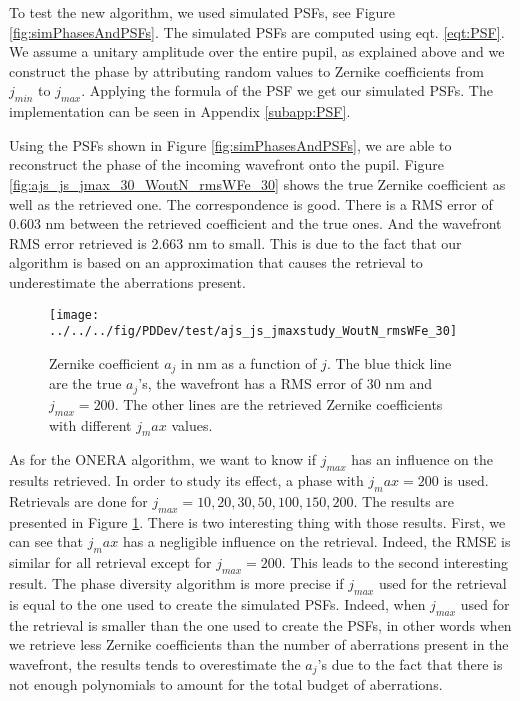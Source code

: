 To test the new algorithm, we used simulated PSFs, see Figure \ref{fig:simPhasesAndPSFs}. The simulated PSFs are computed using eqt. \eqref{eqt:PSF}. We assume a unitary amplitude over the entire pupil, as explained above and we construct the phase by attributing random values to Zernike coefficients from $j_{min}$ to $j_{max}$. Applying the formula of the PSF we get our simulated PSFs. The implementation can be seen in Appendix \ref{subapp:PSF}.

Using the PSFs shown in Figure \ref{fig:simPhasesAndPSFs}, we are able to reconstruct the phase of the incoming wavefront onto the pupil. Figure \ref{fig:ajs_js_jmax_30_WoutN_rmsWFe_30} shows the true Zernike coefficient as well as the retrieved one. The correspondence is good. There is a RMS error of 0.603 nm between the retrieved coefficient and the true ones. And the wavefront RMS error retrieved is 2.663 nm to small. This is due to the fact that our algorithm is based on an approximation that causes the retrieval to underestimate the aberrations present.

\begin{figure}
\begin{center}
\texttt{[image: ../../../fig/PDDev/test/ajs\_js\_jmaxstudy\_WoutN\_rmsWFe\_30]}
\decoRule
\caption{Zernike coefficient $a_j$ in nm as a function of $j$. The blue thick line are the true $a_j$'s, the wavefront has a RMS error of 30 nm and $j_{max}= 200$. The other lines are the retrieved Zernike coefficients with different $j_max$ values.}
\label{fig:ajs_js_jmaxstudy_WoutN_rmsWFe_30}
\end{center}
\end{figure}

As for the ONERA algorithm, we want to know if $j_{max}$ has an influence on the results retrieved. In order to study its effect, a phase with $j_max = 200$ is used. Retrievals are done for $j_{max} = 10, 20 , 30, 50,100,150,200$. The results are presented in Figure \ref{fig:ajs_js_jmaxstudy_WoutN_rmsWFe_30}. There is two interesting thing with those results. First, we can see that $j_max$ has a negligible influence on the retrieval. Indeed, the RMSE is similar for all retrieval except for $j_{max} = 200$. This leads to the second interesting result. The phase diversity algorithm is more precise if $j_{max}$ used for the retrieval is equal to the one used to create the simulated PSFs. Indeed, when $j_{max}$ used for the retrieval is smaller than the one used to create the PSFs, in other words when we retrieve less Zernike coefficients than the number of aberrations present in the wavefront, the results tends to overestimate the $a_j$'s due to the fact that there is not enough polynomials to amount for the total budget of aberrations.

